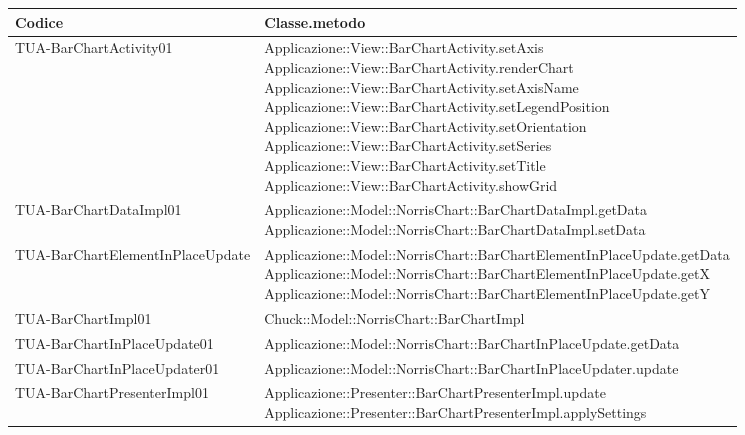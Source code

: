 
				\begin{longtabu} spread 1cm [c]{|p{6cm}|p{8cm}|}
					\hline
					\rowfont{\bf \centering}
					Codice &
					Classe.metodo \\
					\hline
					\endhead
					
					TUA-BarChartActivity01 & \parbox[t]{4cm}{ Applicazione::View::BarChartActivity.setAxis \\ Applicazione::View::BarChartActivity.renderChart \\ Applicazione::View::BarChartActivity.setAxisName \\ Applicazione::View::BarChartActivity.setLegendPosition \\ Applicazione::View::BarChartActivity.setOrientation \\ Applicazione::View::BarChartActivity.setSeries \\ Applicazione::View::BarChartActivity.setTitle \\ Applicazione::View::BarChartActivity.showGrid }\\
                \hline
                TUA-BarChartDataImpl01 & \parbox[t]{4cm}{ Applicazione::Model::NorrisChart::BarChartDataImpl.getData \\ Applicazione::Model::NorrisChart::BarChartDataImpl.setData }\\
                \hline
                TUA-BarChartElementInPlaceUpdate & \parbox[t]{4cm}{ Applicazione::Model::NorrisChart::BarChartElementInPlaceUpdate.getData \\ Applicazione::Model::NorrisChart::BarChartElementInPlaceUpdate.getX \\ Applicazione::Model::NorrisChart::BarChartElementInPlaceUpdate.getY }\\
                \hline
                TUA-BarChartImpl01 & \parbox[t]{4cm}{ Chuck::Model::NorrisChart::BarChartImpl }\\
                \hline
                TUA-BarChartInPlaceUpdate01 & \parbox[t]{4cm}{ Applicazione::Model::NorrisChart::BarChartInPlaceUpdate.getData }\\
                \hline
                TUA-BarChartInPlaceUpdater01 & \parbox[t]{4cm}{ Applicazione::Model::NorrisChart::BarChartInPlaceUpdater.update }\\
                \hline
                TUA-BarChartPresenterImpl01 & \parbox[t]{4cm}{ Applicazione::Presenter::BarChartPresenterImpl.update \\ Applicazione::Presenter::BarChartPresenterImpl.applySettings }\\

\end{longtabu}
